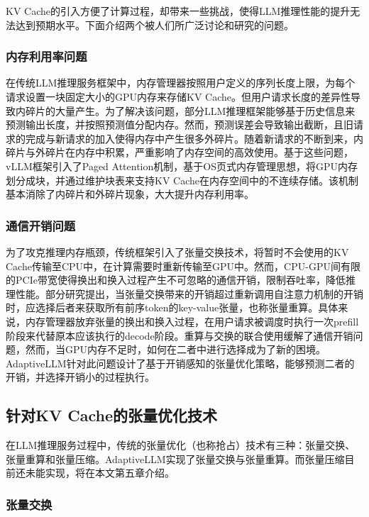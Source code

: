 KV Cache的引入方便了计算过程，却带来一些挑战，使得LLM推理性能的提升无法达到预期水平。下面介绍两个被人们所广泛讨论和研究的问题。

\subsubsection{内存利用率问题}

在传统LLM推理服务框架\cite{Swapping}中，内存管理器按照用户定义的序列长度上限，为每个请求设置一块固定大小的GPU内存来存储KV Cache。但用户请求长度的差异性导致内碎片的大量产生。为了解决该问题，部分LLM推理框架\cite{Output-Length-Prediction}能够基于历史信息来预测输出长度，并按照预测值分配内存。然而，预测误差会导致输出截断，且旧请求的完成与新请求的加入使得内存中产生很多外碎片。随着新请求的不断到来，内碎片与外碎片在内存中积累，严重影响了内存空间的高效使用。基于这些问题，vLLM框架\cite{vLLM}引入了Paged Attention机制，基于OS页式内存管理思想，将GPU内存划分成块，并通过维护块表来支持KV Cache在内存空间中的不连续存储。该机制基本消除了内碎片和外碎片现象，大大提升内存利用率。

\subsubsection{通信开销问题}

为了攻克推理内存瓶颈，传统框架引入了张量交换技术\cite{Swapping, vLLM, LightLLM}，将暂时不会使用的KV Cache传输至CPU中，在计算需要时重新传输至GPU中。然而，CPU-GPU间有限的PCIe带宽使得换出和换入过程产生不可忽略的通信开销，限制吞吐率，降低推理性能。部分研究提出\cite{Recomputation}，当张量交换带来的开销超过重新调用自注意力机制的开销时，应选择后者来获取所有前序token的key-value张量，也称张量重算。具体来说，内存管理器放弃张量的换出和换入过程，在用户请求被调度时执行一次prefill阶段来代替原本应该执行的decode阶段。重算与交换的联合使用缓解了通信开销问题，然而，当GPU内存不足时，如何在二者中进行选择成为了新的困境。AdaptiveLLM针对此问题设计了基于开销感知的张量优化策略，能够预测二者的开销，并选择开销小的过程执行。

\subsection{针对KV Cache的张量优化技术}

在LLM推理服务过程中，传统的张量优化（也称抢占）技术有三种：张量交换、张量重算和张量压缩\cite{Swapping}。AdaptiveLLM实现了张量交换与张量重算。而张量压缩目前还未能实现，将在本文第五章介绍。

\subsubsection{张量交换}

